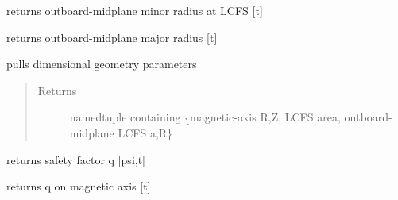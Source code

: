 \documentclass[letterpaper,10pt,english]{sphinxmanual}
\begin{document}
\begin{fulllineitems}
\begin{fulllineitems}
\end{fulllineitems}


\begin{fulllineitems}
\label{eqtools:eqtools.EFIT.EFITTree.getAOut}
returns outboard-midplane minor radius at LCFS {[}t{]}

\end{fulllineitems}


\begin{fulllineitems}
\label{eqtools:eqtools.EFIT.EFITTree.getRmidOut}
returns outboard-midplane major radius {[}t{]}

\end{fulllineitems}


\begin{fulllineitems}
\label{eqtools:eqtools.EFIT.EFITTree.getGeometry}
pulls dimensional geometry parameters
\begin{quote}\begin{description}
\item[{Returns}] \leavevmode
namedtuple containing \{magnetic-axis R,Z, LCFS area, outboard-midplane LCFS a,R\}

\end{description}\end{quote}

\end{fulllineitems}


\begin{fulllineitems}
\label{eqtools:eqtools.EFIT.EFITTree.getQProfile}
returns safety factor q {[}psi,t{]}

\end{fulllineitems}


\begin{fulllineitems}
\label{eqtools:eqtools.EFIT.EFITTree.getQ0}
returns q on magnetic axis {[}t{]}


\end{fulllineitems}
\end{fulllineitems}
\end{document}
